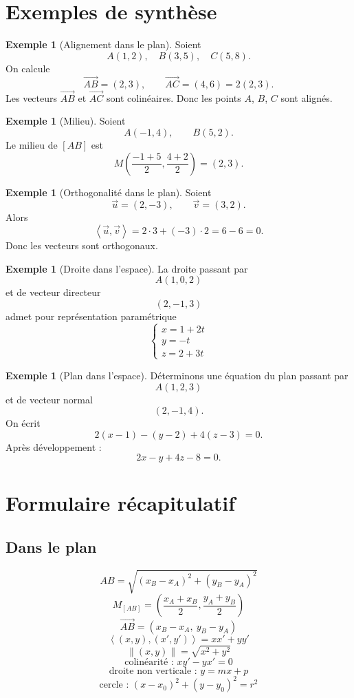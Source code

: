 \documentclass[11pt,a4paper]{article}
\newcommand{\norme}[1]{\left\|#1\right\|}
\newcommand{\ps}[2]{\left\langle #1,#2\right\rangle}
\newcommand{\uu}{\overrightarrow{u}}
\newcommand{\vv}{\overrightarrow{v}}
\theoremstyle{definition}
\newtheorem{exemple}[definition]{Exemple}
\theoremstyle{plain}
\begin{document}
\section{Exemples de synthèse}

\begin{exemple}[Alignement dans le plan]
Soient
\[
A(1,2),\quad B(3,5),\quad C(5,8).
\]
On calcule
\[
\overrightarrow{AB}=(2,3),\qquad \overrightarrow{AC}=(4,6)=2(2,3).
\]
Les vecteurs $\overrightarrow{AB}$ et $\overrightarrow{AC}$ sont colinéaires.
Donc les points $A$, $B$, $C$ sont alignés.
\end{exemple}

\begin{exemple}[Milieu]
Soient
\[
A(-1,4),\qquad B(5,2).
\]
Le milieu de $[AB]$ est
\[
M\left(\frac{-1+5}{2},\frac{4+2}{2}\right)=(2,3).
\]
\end{exemple}

\begin{exemple}[Orthogonalité dans le plan]
Soient
\[
\uu=(2,-3),\qquad \vv=(3,2).
\]
Alors
\[
\ps{\uu}{\vv}=2\cdot 3+(-3)\cdot 2=6-6=0.
\]
Donc les vecteurs sont orthogonaux.
\end{exemple}

\begin{exemple}[Droite dans l'espace]
La droite passant par
\[
A(1,0,2)
\]
et de vecteur directeur
\[
(2,-1,3)
\]
admet pour représentation paramétrique
\[
\left\{
\begin{array}{l}
x=1+2t\\
y=-t\\
z=2+3t
\end{array}
\right.
\]
\end{exemple}

\begin{exemple}[Plan dans l'espace]
Déterminons une équation du plan passant par
\[
A(1,2,3)
\]
et de vecteur normal
\[
(2,-1,4).
\]
On écrit
\[
2(x-1)-(y-2)+4(z-3)=0.
\]
Après développement :
\[
2x-y+4z-8=0.
\]
\end{exemple}

\section{Formulaire récapitulatif}

\subsection*{Dans le plan}
\[
AB=\sqrt{(x_B-x_A)^2+(y_B-y_A)^2}
\]
\[
M_{[AB]}=\left(\frac{x_A+x_B}{2},\frac{y_A+y_B}{2}\right)
\]
\[
\overrightarrow{AB}=(x_B-x_A,\ y_B-y_A)
\]
\[
\ps{(x,y)}{(x',y')}=xx'+yy'
\]
\[
\norme{(x,y)}=\sqrt{x^2+y^2}
\]
\[
\text{colinéarité : } xy'-yx'=0
\]
\[
\text{droite non verticale : } y=mx+p
\]
\[
\text{cercle : } (x-x_0)^2+(y-y_0)^2=r^2
\]
\end{document}
